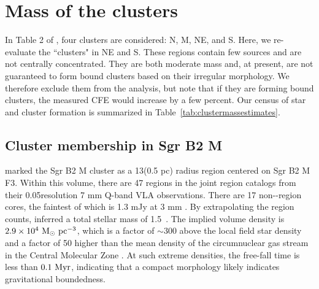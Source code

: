 \documentclass[twocolumn]{aastex62}
\begin{document}
\section{Mass of the clusters}

In Table 2 of \citet{Ginsburg2018a}, four clusters are considered: N, M, NE, and
S.  Here, we re-evaluate the ``clusters" in NE and S.  These regions contain
few sources and are not centrally concentrated.
They are both moderate mass and, at present, are not guaranteed to form bound
clusters based on their irregular morphology.  We therefore exclude them from
the analysis, but note that if they are forming bound clusters, the measured
CFE would increase by a few percent. Our census of star and cluster formation
is summarized in Table~\ref{tab:clustermassestimates}.



\subsection{Cluster membership in Sgr B2 M}
\label{sec:mmass}
\citet{Schmiedeke2016a} marked the Sgr B2 M cluster as a 13\arcsec  (0.5 pc) radius
region centered on Sgr B2 M F3.  Within this volume, there are 47 \hii regions
in the joint  \hii region catalogs \citep{Gaume1995a,De-Pree2015a} from their
0.05\arcsec resolution 7 mm Q-band
VLA observations.  There are 17 non-\hii-region cores, the faintest of which is
1.3 mJy at 3 mm \citep{Ginsburg2018a}.  By extrapolating the \hii region counts,
\citet{Ginsburg2018a} inferred a total stellar mass of 1.5~\msun. The
implied volume density is $2.9\times10^4~\mathrm{M}_{\odot}~\mathrm{pc}^{-3}$, which is a factor of
$\sim300$ above the local field star density
\citep{Launhardt2002a,Kruijssen2015a} and a factor of 50 higher than the mean
density of the circumnuclear gas stream in the Central Molecular Zone
\citep[CMZ; e.g.][]{Longmore2013b}. At such extreme densities, the free-fall
time is less than $0.1~\mathrm{Myr}$, indicating that a compact morphology likely
indicates gravitational boundedness.

% 
\end{document}
